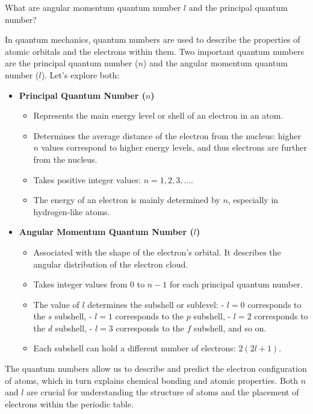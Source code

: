 \begin{ai}
What are angular momentum quantum number \( l \) and  the principal quantum number?
\end{ai}

\begin{airesult}
In quantum mechanics, quantum numbers are used to describe the properties of atomic orbitals and the
electrons within them. Two important quantum numbers are the principal quantum number (\( n \)) and
the angular momentum quantum number (\( l \)). Let's explore both:

\vsp

\begin{itemize}
\item \textbf{Principal Quantum Number (\( n \))}

  \begin{itemize}
  \item Represents the main energy level or shell of an electron in an atom.
  \item Determines the average distance of the electron from the nucleus: higher \( n \) values
    correspond to higher energy levels, and thus electrons are further from the nucleus.
  \item Takes positive integer values: \( n = 1, 2, 3, \ldots \).
  \item The energy of an electron is mainly determined by \( n \), especially in hydrogen-like
    atoms.
  \end{itemize}

\item \textbf{Angular Momentum Quantum Number (\( l \))}

  \begin{itemize}
  \item Associated with the shape of the electron's orbital. It describes the angular distribution
    of the electron cloud.
  \item Takes integer values from 0 to \( n-1 \) for each principal quantum number.
  \item The value of \( l \) determines the subshell or sublevel:
    - \( l = 0 \) corresponds to the \( s \) subshell,
    - \( l = 1 \) corresponds to the \( p \) subshell,
    - \( l = 2 \) corresponds to the \( d \) subshell,
    - \( l = 3 \) corresponds to the \( f \) subshell, and so on.
  \item Each subshell can hold a different number of electrons: \( 2(2l + 1) \).
  \end{itemize}
\end{itemize}

\vsp

The quantum numbers allow us to describe and predict the electron configuration of atoms, which in
turn explains chemical bonding and atomic properties. Both \( n \) and \( l \) are crucial for
understanding the structure of atoms and the placement of electrons within the periodic table.
\end{airesult}


